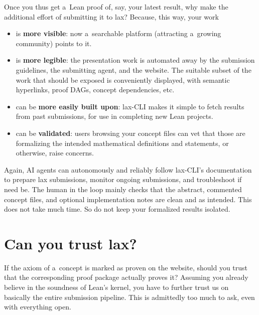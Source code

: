 \documentclass[11pt,a4paper]{article}
\begin{document}
Once you thus get a~Lean proof of, say, your latest result, why make the additional effort of submitting it to lax?
Because, this way, your work
\begin{itemize}
\item is \textbf{more visible}: now a~searchable platform (attracting a~growing community) points to it.
\item is \textbf{more legible}: the presentation work is automated away by the submission guidelines, the submitting agent, and the website.
  The suitable subset of the work that should be exposed is conveniently displayed, with semantic hyperlinks, proof DAGs, concept dependencies, etc.    
\item can be \textbf{more easily built upon}: \textsf{lax-CLI} makes it simple to fetch results from past submissions, for use in completing new Lean projects. 
\item can be \textbf{validated}: users browsing your concept files can vet that those are formalizing the intended mathematical definitions and statements, or otherwise, raise concerns.  
\end{itemize}
Again, AI agents can autonomously and reliably follow \textsf{lax-CLI}'s documentation to prepare lax submissions, monitor ongoing submissions, and troubleshoot if need be.
The human in the loop mainly checks that the abstract, commented concept files, and optional implementation notes are clean and as intended.
This does not take much time.
So do not keep your formalized results isolated.

\section{Can you trust lax?}

If the axiom of a~concept is marked as proven on the website, should you trust that the corresponding proof package actually proves it?
Assuming you already believe in the soundness of Lean's kernel, you have to further trust us on basically the entire submission pipeline.
This is admittedly too much to ask, even with everything open.
\end{document}
